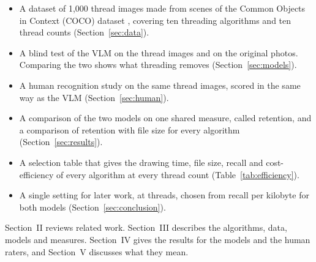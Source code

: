\documentclass[conference]{IEEEtran}
\providecommand{\SizeOnlyBest}{}\providecommand{\SizeOnlyBestVlm}{}\providecommand{\SizeOnlyBestYolo}{}\providecommand{\SizeOnlyVlmY}{0}\providecommand{\SizeOnlyYoloY}{0}
\providecommand{\CarryThreads}{}\providecommand{\CarryKB}{}\providecommand{\CarryVlm}{}\providecommand{\CarryYolo}{}
\begin{document}
\begin{itemize}
\item A dataset of 1,000 thread images made from scenes of the Common Objects in Context (COCO) dataset \cite{lin2014}, covering ten threading algorithms and ten thread counts (Section~\ref{sec:data}).
\item A blind test of the VLM on the thread images and on the original photos. Comparing the two shows what threading removes (Section~\ref{sec:models}).
\item A human recognition study on the same thread images, scored in the same way as the VLM (Section~\ref{sec:human}).
\item A comparison of the two models on one shared measure, called retention, and a comparison of retention with file size for every algorithm (Section~\ref{sec:results}).
\item A selection table that gives the drawing time, file size, recall and cost-efficiency of every algorithm at every thread count (Table~\ref{tab:efficiency}).
\item A single setting for later work, \SizeOnlyBest{} at \CarryThreads{} threads, chosen from recall per kilobyte for both models (Section~\ref{sec:conclusion}).
\end{itemize}

Section~II reviews related work. Section~III describes the algorithms, data, models and measures. Section~IV gives the results for the models and the human raters, and Section~V discusses what they mean.
\end{document}
